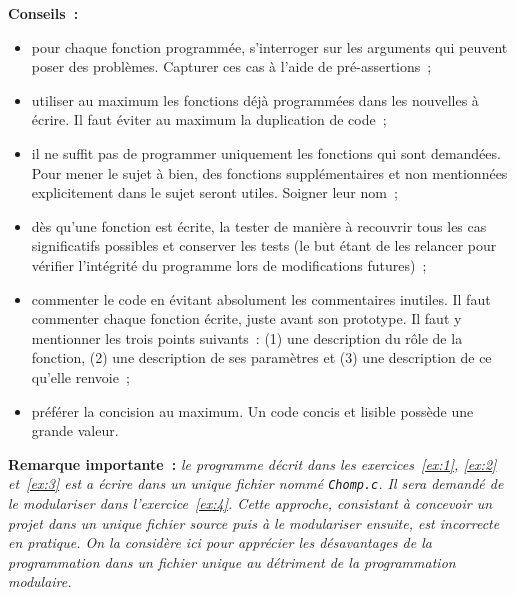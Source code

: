 \documentclass[12pt]{article}
\theoremstyle{definition}
\begin{document}
{\bf Conseils~:}
\begin{itemize}
    \item pour chaque fonction programmée, s'interroger sur les arguments
    qui peuvent poser des problèmes. Capturer ces cas à l'aide de
    pré-assertions~;
    \item utiliser au maximum les fonctions déjà programmées dans les
    nouvelles à écrire. Il faut éviter au maximum la duplication de code~;
    \item il ne suffit pas de programmer uniquement les fonctions qui sont
    demandées. Pour mener le sujet à bien, des fonctions supplémentaires
    et non mentionnées explicitement dans le sujet seront utiles. Soigner
    leur nom~;
    \item dès qu'une fonction est écrite, la tester de manière à
    recouvrir tous les cas significatifs possibles et conserver les tests
    (le but étant de les relancer pour vérifier l'intégrité du
    programme lors de modifications futures)~;
    \item commenter le code en évitant absolument les commentaires inutiles.
    Il faut commenter chaque fonction écrite, juste avant son prototype.
    Il faut y mentionner les trois points suivants~: (1) une description
    du rôle de la fonction, (2) une description de ses paramètres et (3)
    une description de ce qu'elle renvoie~;
    \item préférer la concision au maximum. Un code concis et lisible
    possède une grande valeur.
\end{itemize}
\bigskip
\bigskip

{\bf Remarque importante~:} {\it le programme décrit dans les 
exercices~\ref{ex:1}, \ref{ex:2} et~\ref{ex:3} est a écrire dans un 
unique fichier nommé {\tt Chomp.c}. Il sera demandé de le modulariser 
dans l'exercice~\ref{ex:4}. Cette approche, consistant à concevoir un 
projet dans un unique fichier source puis à le modulariser ensuite, est 
incorrecte en pratique. On la considère ici pour apprécier les 
désavantages de la programmation dans un fichier unique au détriment de 
la programmation modulaire.}
\bigskip
\bigskip
\end{document}
